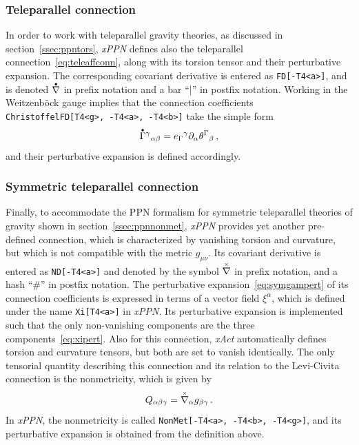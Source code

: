 \documentclass[notitlepage,a4paper,aps,prd,onecolumn,superscriptaddress,nofootinbib,groupedaddress,longbibliography]{revtex4-1}
\newcommand{\tp}[1]{\accentset{\bullet}{#1}}
\newcommand{\st}[1]{\accentset{\times}{#1}}
\newcommand{\xPPN}{\emph{xPPN}}
\newcommand{\xAct}{\emph{xAct}}
\begin{document}
\subsubsection{Teleparallel connection}\label{sssec:telep}
In order to work with teleparallel gravity theories, as discussed in section~\ref{ssec:ppntors}, \xPPN{} defines also the teleparallel connection~\eqref{eq:teleaffconn}, along with its torsion tensor and their perturbative expansion. The corresponding covariant derivative is entered as \lstinline/FD[-T4<a>]/, and is denoted \(\tp{\nabla}\) in prefix notation and a bar ``|'' in postfix notation. Working in the Weitzenböck gauge implies that the connection coefficients \lstinline/ChristoffelFD[T4<g>, -T4<a>, -T4<b>]/ take the simple form
\begin{equation}
\tp{\Gamma}^{\gamma}{}_{\alpha\beta} = e_{\Gamma}{}^{\gamma}\partial_{\alpha}\theta^{\Gamma}{}_{\beta}\,,
\end{equation}
and their perturbative expansion is defined accordingly.

\subsubsection{Symmetric teleparallel connection}\label{sssec:symtelep}
Finally, to accommodate the PPN formalism for symmetric teleparallel theories of gravity shown in section~\ref{ssec:ppnnonmet}, \xPPN{} provides yet another pre-defined connection, which is characterized by vanishing torsion and curvature, but which is not compatible with the metric \(g_{\mu\nu}\). Its covariant derivative is entered as \lstinline/ND[-T4<a>]/ and denoted by the symbol \(\st{\nabla}\) in prefix notation, and a hash ``\#'' in postfix notation. The perturbative expansion~\eqref{eq:symgampert} of its connection coefficients is expressed in terms of a vector field \(\xi^{\alpha}\), which is defined under the name \lstinline/Xi[T4<a>]/ in \xPPN. Its perturbative expansion is implemented such that the only non-vanishing components are the three components~\eqref{eq:xipert}. Also for this connection, \xAct{} automatically defines torsion and curvature tensors, but both are set to vanish identically. The only tensorial quantity describing this connection and its relation to the Levi-Civita connection is the nonmetricity, which is given by
\begin{equation}
Q_{\alpha\beta\gamma} = \st{\nabla}_{\alpha}g_{\beta\gamma}\,.
\end{equation}
In \xPPN, the nonmetricity is called \lstinline/NonMet[-T4<a>, -T4<b>, -T4<g>]/, and its perturbative expansion is obtained from the definition above.
\end{document}

